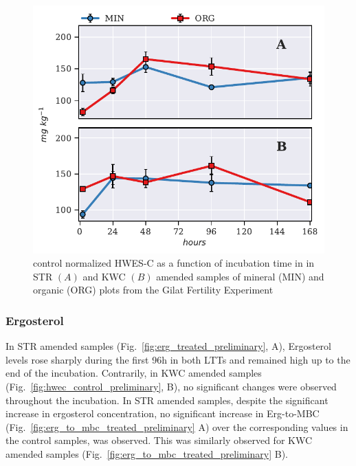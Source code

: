 			\begin{figure}[H]
				\centering
				\includegraphics[width=\linewidth]{thesis_figures/preliminary/control_normalized/HWES-C.pdf}
				\caption{control normalized HWES-C  as a function of incubation time in in STR $\left(A\right)$ and KWC $\left(B\right)$ amended samples of mineral (MIN) and organic (ORG) plots from the Gilat Fertility Experiment}
				\label{fig:nor_hwes-c_treated_preliminary}
			\end{figure}

		\subsubsection{Ergosterol}
			In STR amended samples (Fig.\ \ref{fig:erg_treated_preliminary}, A), Ergosterol levels rose sharply during the first 96h in both LTTs and remained high up to the end of the incubation. Contrarily, in KWC amended samples (Fig.\ \ref{fig:hwec_control_preliminary}, B), no significant changes were observed throughout the incubation. In STR amended samples, despite the significant increase in ergosterol concentration, no significant increase in Erg-to-MBC (Fig.\ \ref{fig:erg_to_mbc_treated_preliminary} A) over the corresponding values in the control samples, was observed. This was similarly observed for KWC amended samples (Fig.\ \ref{fig:erg_to_mbc_treated_preliminary} B).

